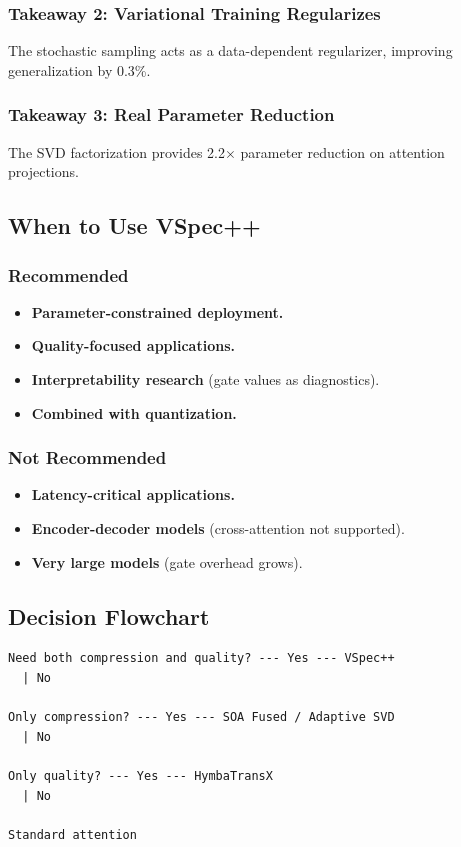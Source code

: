 \subsubsection{Takeaway 2: Variational Training Regularizes}

The stochastic sampling acts as a data-dependent regularizer, improving 
generalization by 0.3\%.

\subsubsection{Takeaway 3: Real Parameter Reduction}

The SVD factorization provides 2.2$\times$ parameter reduction on 
attention projections.

\subsection{When to Use VSpec++}

\subsubsection{Recommended}
\begin{itemize}
\item \textbf{Parameter-constrained deployment.}
\item \textbf{Quality-focused applications.}
\item \textbf{Interpretability research} (gate values as diagnostics).
\item \textbf{Combined with quantization.}

\end{itemize}
\subsubsection{Not Recommended}
\begin{itemize}
\item \textbf{Latency-critical applications.}
\item \textbf{Encoder-decoder models} (cross-attention not supported).
\item \textbf{Very large models} (gate overhead grows).

\end{itemize}
\subsection{Decision Flowchart}

\begin{lstlisting}
Need both compression and quality? --- Yes --- VSpec++
  | No
   
Only compression? --- Yes --- SOA Fused / Adaptive SVD
  | No
   
Only quality? --- Yes --- HymbaTransX
  | No
   
Standard attention
\end{lstlisting}

